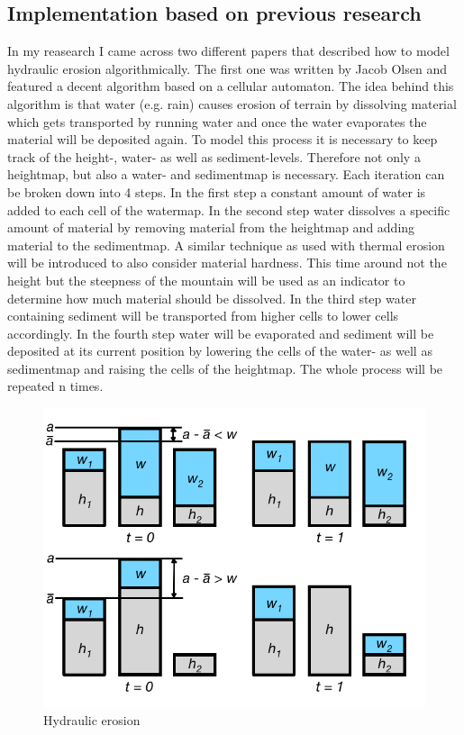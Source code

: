 \documentclass[11pt,a4paper,twoside,openright]{report}
\begin{document}
\subsection{Implementation based on previous research}
In my reasearch I came across two different papers that described how to model hydraulic erosion algorithmically. The first one \cite{Olsen:2004} was written by Jacob Olsen and featured a decent algorithm based on a cellular automaton. The idea behind this algorithm is that water (e.g. rain) causes erosion of terrain by dissolving material which gets transported by running water and once the water evaporates the material will be deposited again. To model this process it is necessary to keep track of the height-, water- as well as sediment-levels. Therefore not only a heightmap, but also a water- and sedimentmap is necessary. Each iteration can be broken down into 4 steps. In the first step a constant amount of water is added to each cell of the watermap. In the second step water dissolves a specific amount of material by removing material from the heightmap and adding material to the sedimentmap. A similar technique as used with thermal erosion will be introduced to also consider material hardness. This time around not the height but the steepness of the mountain will be used as an indicator to determine how much material should be dissolved. In the third step water containing sediment will be transported from higher cells to lower cells accordingly. In the fourth step water will be evaporated and sediment will be deposited at its current position by lowering the cells of the water- as well as sedimentmap and raising the cells of the heightmap. The whole process will be repeated n times.
\begin{figure}[h]
\centering
\includegraphics[width=0.65\linewidth]{hydraulicerosion.png}
\caption{Hydraulic erosion}\label{fig:hydrolicerosion}
\end{figure}
\end{document}
